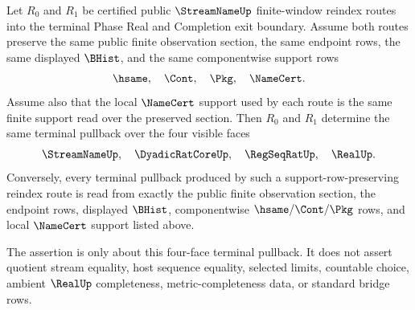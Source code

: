 \begin{theorem}
\label{thm:streamname-terminal-reindex-four-face-pullback}
Let $R_0$ and $R_1$ be certified public $\StreamNameUp$ finite-window
reindex routes into the terminal Phase Real and Completion exit boundary.
Assume both routes preserve the same public finite observation section, the
same endpoint rows, the same displayed $\BHist$, and the same componentwise
support rows
$$
\hsame,\quad \Cont,\quad \Pkg,\quad \NameCert.
$$
Assume also that the local $\NameCert$ support used by each route is the same
finite support read over the preserved section. Then $R_0$ and $R_1$ determine
the same terminal pullback over the four visible faces
$$
\StreamNameUp,\quad \DyadicRatCoreUp,\quad \RegSeqRatUp,\quad \RealUp.
$$
Conversely, every terminal pullback produced by such a support-row-preserving
reindex route is read from exactly the public finite observation section, the
endpoint rows, displayed $\BHist$, componentwise $\hsame/\Cont/\Pkg$ rows, and
local $\NameCert$ support listed above.

The assertion is only about this four-face terminal pullback. It does not
assert quotient stream equality, host sequence equality, selected limits,
countable choice, ambient $\RealUp$ completeness, metric-completeness data, or
standard bridge rows.
\end{theorem}
